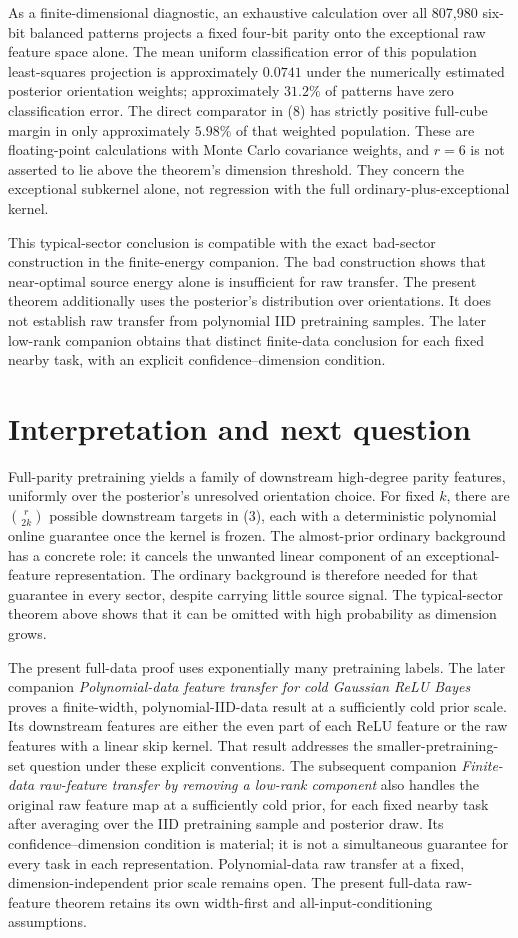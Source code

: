 \documentclass[11pt]{article}
\begin{document}
As a finite-dimensional diagnostic, an exhaustive calculation over all
807,980 six-bit balanced patterns projects a fixed four-bit parity onto
the exceptional raw feature space alone. The mean uniform classification
error of this population least-squares projection is approximately
$0.0741$ under the numerically estimated posterior orientation weights;
approximately $31.2\%$ of patterns have zero classification error.
The direct comparator in (8) has strictly positive full-cube margin in
only approximately $5.98\%$ of that weighted population. These are
floating-point calculations with Monte Carlo covariance weights, and
$r=6$ is not asserted to lie above the theorem's dimension threshold.
They concern the exceptional subkernel alone, not regression with the
full ordinary-plus-exceptional kernel.

This typical-sector conclusion is compatible with the exact bad-sector
construction in the finite-energy companion. The bad construction shows
that near-optimal source energy alone is insufficient for raw transfer.
The present theorem additionally uses the posterior's distribution over
orientations. It does not establish raw transfer from polynomial IID
pretraining samples. The later low-rank companion obtains that distinct
finite-data conclusion for each fixed nearby task, with an explicit
confidence--dimension condition.

\section{Interpretation and next question}
Full-parity pretraining yields a family of downstream high-degree parity
features, uniformly over the posterior's unresolved orientation choice.
For fixed $k$, there are $\binom r{2k}$ possible downstream targets in
(3), each with a deterministic polynomial online guarantee once the
kernel is frozen. The almost-prior ordinary background has a concrete
role: it cancels the unwanted linear component of an exceptional-feature
representation. The ordinary background is therefore needed for that guarantee in every
sector, despite carrying little source signal. The typical-sector theorem
above shows that it can be omitted with high probability as dimension grows.

The present full-data proof uses exponentially many pretraining labels.
The later companion \emph{Polynomial-data feature transfer for cold
Gaussian ReLU Bayes} proves a finite-width, polynomial-IID-data result
at a sufficiently cold prior scale. Its downstream features are either
the even part of each ReLU feature or the raw features with a linear
skip kernel. That result addresses the smaller-pretraining-set question
under these explicit conventions. The subsequent companion
\emph{Finite-data raw-feature transfer by removing a low-rank component}
also handles the original raw feature map at a sufficiently cold prior,
for each fixed nearby task after averaging over the IID pretraining
sample and posterior draw. Its confidence--dimension condition is
material; it is not a simultaneous guarantee for every task in each
representation. Polynomial-data raw transfer at a fixed,
dimension-independent prior
scale remains open. The present full-data raw-feature theorem retains
its own width-first and all-input-conditioning assumptions.
\end{document}
